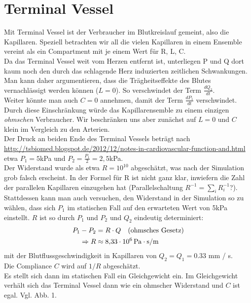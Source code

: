 \documentclass[a4paper,12pt]{scrartcl}
\begin{document}
\section*{Terminal Vessel}
Mit Terminal Vessel ist der Verbraucher im Blutkreislauf gemeint, also die Kapillaren. Speziell betrachten wir all die vielen Kapillaren in einem Ensemble vereint als ein Compartment mit je einem Wert für R, L, C.\\
Da das Terminal Vessel weit vom Herzen entfernt ist, unterliegen P und Q dort kaum noch den durch das schlagende Herz induzierten zeitlichen Schwankungen. Man kann daher argumentieren, dass die Trägheitseffekte des Blutes vernachlässigt werden können ($L=0$). So verschwindet der Term $\frac{dQ_2}{dt}$.\\
Weiter könnte man auch $C=0$ annehmen, damit der Term $\frac{dP_1}{dt}$ verschwindet. Durch diese Einschränkung würde das Kapillarensemble zu einem einzigen \textit{ohmschen} Verbraucher. Wir beschränken uns aber zunächst auf $L=0$ und $C$ klein im Vergleich zu den Arterien.\\

Der Druck an beiden Ende des Terminal Vessels beträgt nach \url{http://tsbiomed.blogspot.de/2012/12/notes-in-cardiovascular-function-and.html} etwa $P_1 = 5$kPa und $P_2 = \frac{P_1}{2} = 2,5$kPa.\\
Der Widerstand wurde als etwa $R=10^{10}$ abgeschätzt, was nach der Simulation grob falsch erscheint. In der Formel für R ist nicht ganz klar, inwiefern die Zahl der parallelen Kapillaren einzugehen hat (Parallelschaltung $R^{-1} = \sum_i R_i^{-1}$?). Stattdessen kann man auch versuchen, den Widerstand in der Simulation so zu wählen, dass sich $P_1$ im statischen Fall auf den erwarteten Wert von 5kPa einstellt. $R$ ist so durch $P_1$ und $P_2$ und $Q_2$ eindeutig determiniert:
\begin{align}
  P_1 - P_2 &= R \cdot Q~~~\text{(ohmsches Gesetz)}\\
  \Rightarrow R &\approx \SI{8.33E6}{Pa\cdot s / m}
\end{align} mit der Blutflussgeschwindigkeit in Kapillaren von $Q_2 = Q_1 = 0.33$ mm / s.\\

Die Compliance $C$ wird auf $1/R$ abgeschätzt.\\

Es stellt sich dann im statischen Fall ein Gleichgewicht ein. Im Gleichgewicht verhält sich das Terminal Vessel dann wie ein ohmscher Widerstand und $C$ ist egal. Vgl. Abb. 1.\\
\end{document}
